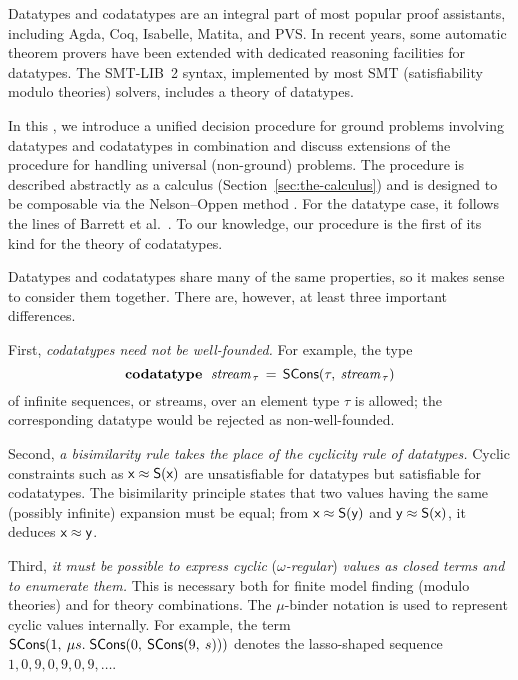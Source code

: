 \nopagebreak

Datatypes and codatatypes are an integral part of most popular proof assistants,
including Agda, Coq, Isabelle, Matita, and PVS. In recent years, some
automatic theorem provers have been extended with dedicated reasoning facilities
for datatypes. The SMT-LIB~2 \cite{barrett-et-al-2010} syntax, implemented by
most SMT (satisfiability modulo theories) solvers, includes a theory of
datatypes.

In this \thewordpaper, we introduce a unified decision procedure for ground
problems involving datatypes and codatatypes in combination and discuss extensions 
of the procedure for handling universal (non-ground) problems.
The procedure is
described abstractly as a calculus (Section~\ref{sec:the-calculus}) and is
designed to be composable via the Nelson--Oppen method \cite{nelson-oppen-1979}.
For the datatype case, it follows the lines of Barrett et al.\ \cite{barrett-et-al-2007}.
To our knowledge, our procedure is the first of its kind for the theory of
codatatypes. 

Datatypes and codatatypes share many of the same properties, so it makes sense
to consider them together. There are, however, at least three important
differences.

First, \emph{codatatypes need not be well-founded.}
For example, the type
%
\[\textbf{codatatype}~\;\textit{stream}_{\,\tau} \,=\, \textsf{SCons}(\tau,\: \textit{stream}_{\,\tau})\]
%
of infinite sequences, or streams, over an element type $\tau$ is allowed; the
corresponding datatype would be rejected as non-well-founded.

Second, \emph{a bisimilarity rule takes the place of the cyclicity rule of datatypes.}
Cyclic constraints such as
$\textsf{x} \approx \textsf{S}(\textsf{x})$ %
are unsatisfiable for datatypes but satisfiable for codatatypes.
The bisimilarity principle states that two values having the same (possibly
infinite) expansion must be equal; from $\textsf{x} \approx \textsf{S}(\textsf{y})$ and
$\textsf{y} \approx \textsf{S}(\textsf{x})$, it deduces $\textsf{x} \approx \textsf{y}$.

Third, \emph{it must be possible to express cyclic }(\emph{$\omega$-regular}) \emph{values as closed terms and
to enumerate them.} This is necessary both for finite model finding (modulo theories)
and for theory combinations. The $\mu$-binder notation is used to represent cyclic
values internally. For example,
the term $\textsf{SCons}(1,\: \mu s.\; \textsf{SCons}(0,\: \textsf{SCons}(9,\: s)))$
denotes the lasso-shaped sequence $1, 0, 9, 0, 9, 0, 9, \ldots$\afterLdots.


